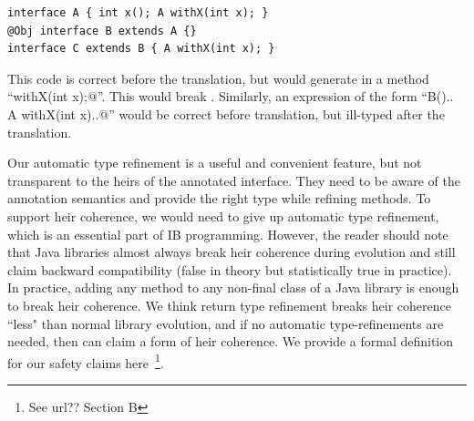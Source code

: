 \begin{lstlisting}
interface A { int x(); A withX(int x); }
@Obj interface B extends A {}
interface C extends B { A withX(int x); }
\end{lstlisting}

\noindent This code is correct before the translation, but \mixin would  generate in \Q@B@  a method ``\Q@B withX(int x);@''.
This would break \Q@C@.
Similarly, an expression of the form ``\Q@new B(){.. A withX(int x){..}}@''
would be correct before translation, but ill-typed after the translation.

Our automatic type refinement is a useful and convenient feature, but
not transparent to the heirs of the annotated interface.  They need to
be aware of the annotation semantics and provide the right type while
refining methods. To support heir coherence, we would need
to give up automatic type refinement, which is an essential part of IB programming.
However, the reader should note that Java libraries almost always break heir
coherence during evolution and still claim backward compatibility (false in
theory but statistically true in practice). In practice, adding any method to any
non-final class of a Java library is enough to break heir
coherence.  We think return type refinement breaks heir coherence ``less" than normal library evolution, and
if no automatic type-refinements are needed, then \mixin can claim a
form of heir coherence.
We provide a formal definition for our safety claims here~\footnote{See url?? Section B}.

